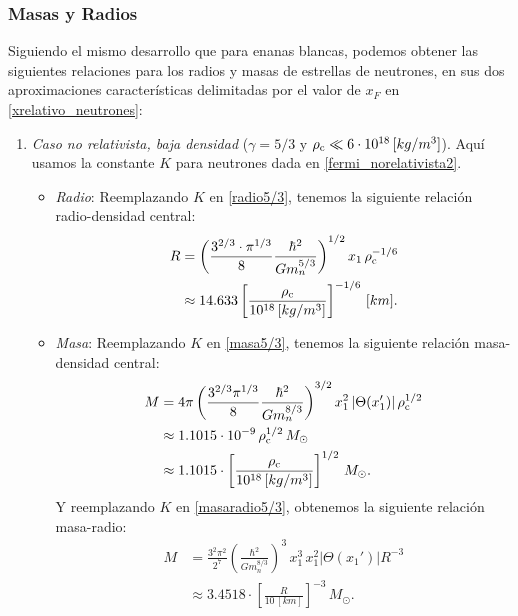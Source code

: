 \subsubsection{Masas y Radios}
Siguiendo el mismo desarrollo que para enanas blancas, podemos obtener las siguientes relaciones para los radios y masas de estrellas de neutrones, en sus dos aproximaciones características delimitadas por el valor de $x_F$ en \eqref{xrelativo_neutrones}:

\begin{enumerate}

\item \emph{Caso no relativista, baja densidad} ($\gamma=5/3$ y $\rho_{\rm c}\ll6\cdot10^{18}\,[kg/m^3]$).
Aquí usamos la constante $K$ para neutrones dada en \eqref{fermi_norelativista2}.
\begin{itemize}
 \item \emph{Radio}:
Reemplazando $K$ en \eqref{radio5/3}, tenemos la siguiente relación radio-densidad central:
\begin{align}
R&=\left(\frac{3^{2/3}\cdot\pi^{1/3}}{8}\frac{\hbar^2}{G m_n^{5/3}}\right)^{1/2}x_1\,\rho_{\rm c}^{-1/6}\\
 &\approx14.633\left[\frac{\rho_{\rm c}}{10^{18}\,[kg/m^3]}\right]^{-1/6}\,[km].
\end{align}
\item \emph{Masa}:
Reemplazando $K$ en \eqref{masa5/3}, tenemos la siguiente relación masa-densidad central:
\begin{align}
M&=4\pi\left(\frac{3^{2/3}\pi^{1/3}}{8}\frac{\hbar^2}{G m_n^{8/3}}\right)^{3/2}x_1^2\left|\Theta(x_1')\right|\rho_{\rm c}^{1/2}\\
&\approx1.1015\cdot 10^{-9}\,\rho_{\rm c}^{1/2}\,M_{\odot}\label{neutrones5/3-masadensidad}\\
&\approx1.1015\cdot\left[\frac{\rho_{\rm c}}{10^{18}\,[kg/m^3]}\right]^{1/2}\,M_{\odot}.
\end{align}
Y reemplazando $K$ en \eqref{masaradio5/3}, obtenemos la siguiente relación masa-radio:
\begin{align}
 M&=\frac{3^2\pi^2}{2^7}\left(\frac{\hbar^2}{Gm_n^{8/3}}\right)^3\,x_1^3\,x_1^2\left|\Theta(x_1')\right| R^{-3}\\
&\approx3.4518\cdot\left[\frac{R}{10\,[km]}\right]^{-3}\,M_{\odot}.\label{neutrones5/3-masaradio}
\end{align}


\end{itemize}
\end{enumerate}
